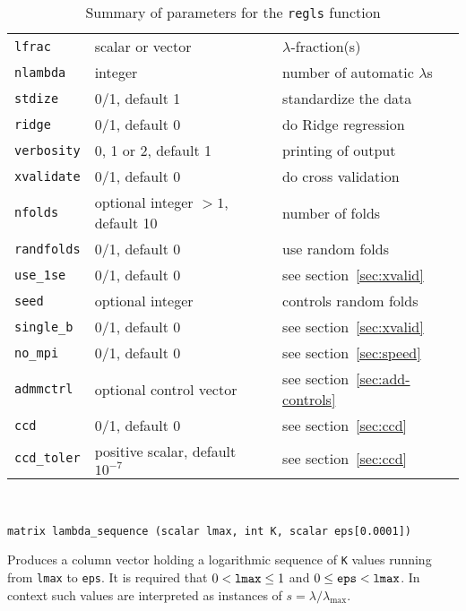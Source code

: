 \documentclass{article}
\newenvironment{funcdoc}
{\noindent\hrulefill\\[-12pt]}
{\medbreak}
\begin{document}
\begin{table}[htbp]
  \centering
  \begin{tabular}{lll}
    \texttt{lfrac} & scalar or vector & $\lambda$-fraction(s) \\
    \texttt{nlambda} & integer & number of automatic $\lambda$s \\
    \texttt{stdize} & 0/1, default 1 & standardize the data \\
    \texttt{ridge} & 0/1, default 0 & do Ridge regression \\
    \texttt{verbosity} & 0, 1 or 2, default 1 & printing of output\\
    \texttt{xvalidate} & 0/1, default 0 & do cross validation\\
    \texttt{nfolds} & optional integer $>1$, default 10 & number of
                                                          folds \\
    \texttt{randfolds} & 0/1, default 0 & use random folds\\
    \texttt{use\_1se} & 0/1, default 0 & see section~\ref{sec:xvalid} \\
    \texttt{seed} & optional integer & controls random folds\\
    \texttt{single\_b} & 0/1, default 0 & see section~\ref{sec:xvalid}\\
    \texttt{no\_mpi} & 0/1, default 0 & see section~\ref{sec:speed}\\
    \texttt{admmctrl} & optional control vector & see
                                                  section~\ref{sec:add-controls} \\
    \texttt{ccd} & 0/1, default 0 & see section~\ref{sec:ccd} \\
    \texttt{ccd\_toler} & positive scalar, default $10^{-7}$ & see section~\ref{sec:ccd}
  \end{tabular}
  \caption{Summary of parameters for the \texttt{regls} function}
  \label{tab:lasso-parms}
\end{table}

\begin{funcdoc}
\begin{verbatim}
matrix lambda_sequence (scalar lmax, int K, scalar eps[0.0001])
\end{verbatim}
  Produces a column vector holding a logarithmic sequence of
  \texttt{K} values running from \texttt{lmax} to \texttt{eps}. It is
  required that $0 < \mbox{\texttt{lmax}} \le 1$ and
  $0 \le \mbox{\texttt{eps}} < \mbox{\texttt{lmax}}$. In context such
  values are interpreted as instances of $s = \lambda/\lambda_{\max}$.
\end{funcdoc}
\end{document}
